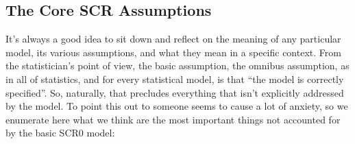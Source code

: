 \subsection{The Core SCR Assumptions}

It's always a good idea to sit down and reflect on the meaning of any
particular model, its various assumptions, and what they mean in a
specific context.  From the statistician's point of view, the basic
assumption, the omnibus assumption, as in all of statistics, and for
every statistical model, is that ``the model is correctly
specified''. So, naturally, that precludes everything that isn't
explicitly addressed by the model.  To point this out to someone seems
to cause a lot of anxiety, so we enumerate here what we think are the
most important things not accounted for by the basic SCR0 model:

